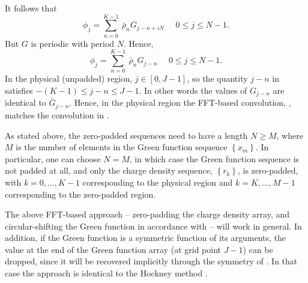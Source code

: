 It follows that
\begin{equation}
{\phi}_j=\sum_{n=0}^{K-1}~\bar{\rho}_n G_{j-n+iN}
~~~~~~0 \le j \le N-1.
\end{equation}
But $G$ is periodic with period $N$. Hence,
\begin{equation}
{\phi}_j=\sum_{n=0}^{K-1}~\bar{\rho}_n G_{j-n}
~~~~~~0 \le j \le N-1.
\label{eq:finaleqn}
\end{equation}
In the physical (unpadded) region, $j\in \left[0,J-1\right]$, so the quantity $j-n$ in  satisfies $-(K-1)\le j-n \le J-1$.
In other words the values of $G_{j-n}$ are identical to $\bar{G}_{j-n}$. Hence, in the physical region the FFT-based convolution, ,
matches the convolution in .

As stated above, the zero-padded sequences need to
have a length $N \ge M$, where $M$ is the number of elements in the Green function sequence $\left\{x_m\right\}$.
In particular, one can choose $N=M$, in which case the Green function sequence is not padded at all, and only
the charge density sequence, $\left\{r_k\right\}$, is zero-padded, with $k=0,\ldots,K-1$ corresponding to the physical region
and $k=K,\ldots,M-1$ corresponding to the zero-padded region.


The  above FFT-based approach -- zero-padding the charge density array, and circular-shifting the Green function in accordance with  -- will work in general.
In addition, if the Green function is a symmetric function of its arguments,  the value at the end of the Green function array
(at grid point $J-1$)
can be dropped, since it will be recovered implicitly through the symmetry of .
In that case the approach is identical to the Hockney method \cite{hockney, eastwoodandbrownrigg,hockneyandeastwood}.

